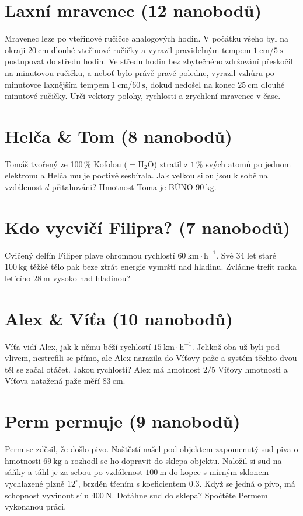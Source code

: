 \documentclass[10pt,a4paper,landscape]{article}
\begin{document}
\begin{multicols}{2}[]
\section{Laxní mravenec (12 nanobodů)}
Mravenec leze po vteřinové ručičce analogových hodin. V počátku všeho byl na okraji $20~\mathrm{cm}$ dlouhé vteřinové ručičky a vyrazil pravidelným tempem $1~\mathrm{cm}$/$5~\mathrm{s}$ postupovat do středu hodin. Ve středu hodin bez zbytečného zdržování přeskočil na minutovou ručičku, a neboť bylo právě pravé poledne, vyrazil vzhůru po minutovce laxnějším tempem $1~\mathrm{cm}$/$60~\mathrm{s}$, dokud nedošel na konec $25~\mathrm{cm}$ dlouhé minutové ručičky. Urči vektory polohy, rychlosti a zrychlení mravence v čase.
\columnbreak

\section{Helča \& Tom (8 nanobodů)}
Tomáš tvořený ze 100\,\% Kofolou ($=\mathrm{H}_2\mathrm{O}$) ztratil z $1\,\%$ svých atomů po jednom elektronu a Helča mu je poctivě sesbírala. Jak velkou silou jsou k sobě na vzdálenost $d$ přitahováni? Hmotnost Toma je BÚNO $90~\mathrm{kg}$. 


\section{Kdo vycvičí Filipra? (7 nanobodů)}
Cvičený delfín Filiper plave ohromnou rychlostí $60~\mathrm{km}\cdot\mathrm{h}^{-1}$. Své 34 let staré $100~\mathrm{kg}$ těžké tělo pak beze ztrát energie vymrští nad hladinu. Zvládne trefit racka letícího $28~\mathrm{m}$ vysoko nad hladinou?

\section{Alex \& Víťa (10 nanobodů)}
Víťa vidí Alex, jak k němu běží rychlostí $15~\mathrm{km}\cdot\mathrm{h}^{-1}$. Jelikož oba už byli pod vlivem, nestrefili se přímo, ale Alex narazila do Víťovy paže a systém těchto dvou těl se začal otáčet. Jakou rychlostí? Alex má hmotnost $2/5$ Víťovy hmotnosti a Víťova natažená paže měří $83~\mathrm{cm}$.

\section{Perm permuje (9 nanobodů)}
	Perm se zděsil, že došlo pivo. Naštěstí našel pod objektem zapomenutý sud piva o hmotnosti $69~\mathrm{kg}$ a rozhodl se ho dopravit do sklepa objektu. Naložil si sud na sáňky a táhl je za sebou po vzdálenost $100~\mathrm{m}$ do kopce s mírným sklonem vychlazené plzně $12^{\circ}$, brzděn třením s koeficientem $0.3$. Když se jedná o pivo, má schopnost vyvinout sílu $400~\mathrm{N}$. Dotáhne sud do sklepa? Spočtěte Permem vykonanou práci.


\end{multicols}
\end{document}
